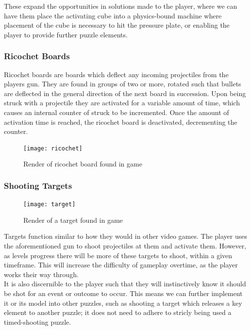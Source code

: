 \documentclass[11pt]{article}
\begin{document}
These expand the opportunities in solutions made to the player, where we can have them place the activating cube into a physics-bound machine where placement of the cube is necessary to hit the pressure plate, or enabling the player to provide further puzzle elements.


\subsubsection{Ricochet Boards}
Ricochet boards are boards which deflect any incoming projectiles from the players gun. They are found in groups of two or more, rotated such that bullets are deflected in the general direction of the next board in succession.
Upon being struck with a projectile they are activated for a variable amount of time, which causes an internal counter of struck to be incremented. Once the amount of activation time is reached, the ricochet board is deactivated, decrementing the counter. 
\begin{figure}[h]
\begin{center}
\texttt{[image: ricochet]}
\end{center}
\caption{Render of ricochet board found in game}
\end{figure}
\newpage

\subsubsection{Shooting Targets}

\begin{figure}
\texttt{[image: target]} 
\caption{Render of a target found in game}
\label{fig:wrapfig}
\end{figure}
Targets function similar to how they would in other video games. The player uses the aforementioned gun to shoot projectiles at them and activate them. However, as levels progress there will be more of these targets to shoot, within a given timeframe. This will increase the difficulty of gameplay overtime, as the player works their way through. \\



It is also discernible to the player such that they will instinctively know it should be shot for an event or outcome to occur. This means we can further implement it or its model into other puzzles, such as shooting a target which releases a key element to another puzzle; it does not need to adhere to stricly being used a timed-shooting puzzle. 
\end{document}
